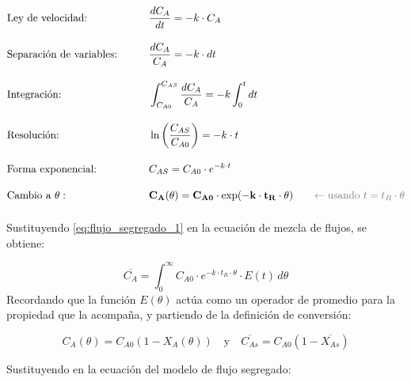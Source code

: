 \begin{alignat}{3}
     & \text{Ley de velocidad:}                    &  & \frac{dC_A}{dt} = -k \cdot C_A                                      &       & \nonumber                                                        \\[10pt]
     & \text{Separación de variables:\hspace{2em}} &  & \frac{dC_A}{C_A} = -k \cdot dt                                      &       & \nonumber                                                        \\[10pt]
     & \text{Integración:}                         &  & \int_{C_{A0}}^{C_{AS}} \frac{dC_A}{C_A} = -k \int_{0}^{t} dt        &       & \nonumber                                                        \\[10pt]
     & \text{Resolución:}                          &  & \ln\left(\frac{C_{AS}}{C_{A0}}\right) = -k \cdot t                  &       & \nonumber                                                        \\[10pt]
     & \text{Forma exponencial:}                   &  & C_{AS} = C_{A0} \cdot e^{-k \cdot t}                                &       & \nonumber                                                        \\[10pt]
     & \text{Cambio a } \theta:                    &  & \mathbf{C_A(\theta) = C_{A0} \cdot \exp(-k \cdot t_R \cdot \theta)} & \quad & \textcolor{gray}{\leftarrow \text{usando } t = t_R \cdot \theta} \\[10pt] \label{eq:flujo_segregado_concentracion}
\end{alignat}
\noindent Sustituyendo \eqref{eq:flujo_segregado_1} en la ecuación de mezcla de flujos, se obtiene:

\begin{equation}
    \overline{C_A} = \int_{0}^{\infty} C_{A0} \cdot e^{-k \cdot t_R \cdot \theta} \cdot E(t) \, d\theta
\end{equation}
\noindent Recordando que la función $E(\theta)$ actúa como un operador de promedio para la propiedad que la acompaña, y partiendo de la definición de conversión:

\begin{equation}
    C_A(\theta) = C_{A0}(1-X_A(\theta)) \quad \text{y} \quad \overline{C_{As}} = C_{A0}(1-\overline{X_{As}})
\end{equation}

\noindent Sustituyendo en la ecuación del modelo de flujo segregado:

